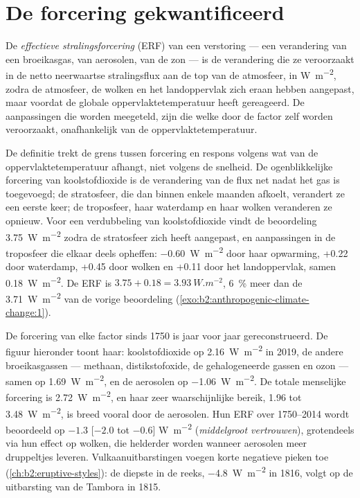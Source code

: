\section{De forcering gekwantificeerd}\label{sec:b2:anthropogenic-climate-change:forcing}

\begin{definition}\label{def:b2:anthropogenic-climate-change:erf}
De \emph{effectieve stralingsforcering} (ERF) van een verstoring
--- een verandering van een broeikasgas, van aerosolen, van de zon --- is de verandering die ze veroorzaakt in de netto
neerwaartse stralingsflux aan de top van de atmosfeer, in \unit{W.m^{-2}}, zodra de atmosfeer,
de wolken en het landoppervlak zich eraan hebben aangepast, maar voordat de globale oppervlaktetemperatuur
heeft gereageerd. De aanpassingen die worden meegeteld, zijn die welke door de factor zelf worden veroorzaakt, onafhankelijk van de
oppervlaktetemperatuur.
\end{definition}

De definitie trekt de grens tussen forcering en respons volgens wat van de
oppervlaktetemperatuur afhangt, niet volgens de snelheid. De ogenblikkelijke forcering van koolstofdioxide is de verandering van de flux net
nadat het gas is toegevoegd; de stratosfeer, die dan binnen enkele maanden afkoelt, verandert ze een eerste keer;
de troposfeer, haar waterdamp en haar wolken veranderen ze opnieuw. Voor een verdubbeling van
koolstofdioxide vindt de beoordeling \qty{3.75}{W.m^{-2}} zodra de stratosfeer zich heeft aangepast, en
aanpassingen in de troposfeer die elkaar deels opheffen: \qty{-0.60}{W.m^{-2}} door haar opwarming, +0.22
door waterdamp, +0.45 door wolken en +0.11 door het landoppervlak, samen \qty{+0.18}{W.m^{-2}}.
De ERF is $3.75 + 0.18 = \qty{3.93}{W.m^{-2}}$, \qty{6}{\percent} meer dan de
\qty{3.71}{W.m^{-2}} van de vorige beoordeling (\cref{exo:b2:anthropogenic-climate-change:1}).

De forcering van elke factor sinds 1750 is jaar voor jaar gereconstrueerd. De figuur hieronder toont
haar: koolstofdioxide op \qty{2.16}{W.m^{-2}} in 2019, de andere broeikasgassen --- methaan,
distikstofoxide, de gehalogeneerde gassen en ozon --- samen op \qty{1.69}{W.m^{-2}}, en de
aerosolen op \qty{-1.06}{W.m^{-2}}. De totale menselijke forcering is \qty{2.72}{W.m^{-2}}, en haar zeer
waarschijnlijke bereik, 1.96 tot \qty{3.48}{W.m^{-2}}, is breed vooral door de aerosolen. Hun ERF over
1750--2014 wordt beoordeeld op $-1.3$ [$-2.0$ tot $-0.6$] \unit{W.m^{-2}} (\emph{middelgroot vertrouwen}),
grotendeels via hun effect op wolken, die helderder worden wanneer aerosolen meer druppeltjes leveren.
Vulkaanuitbarstingen voegen korte negatieve pieken toe (\cref{ch:b2:eruptive-styles}): de diepste in de
reeks, \qty{-4.8}{W.m^{-2}} in 1816, volgt op de uitbarsting van de Tambora in 1815.

